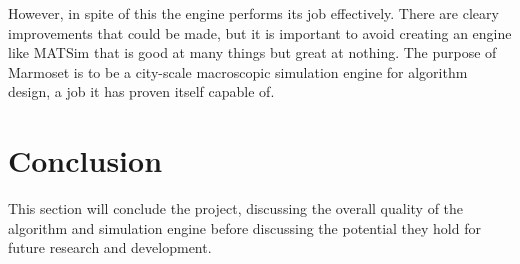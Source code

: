 \documentclass[ %
                    author={Alexander Hill},
                supervisor={Dr. Benjamin Sach},
                    degree={MEng},
                     title={MARMOSET},
                  subtitle={Multi-Agent Route Management using Online Simulation for Efficient Transportation},
                      type={research},
                      year={2016} ]{dissertation}
\begin{document}
However, in spite of this the engine performs its job effectively. There are
cleary improvements that could be made, but it is important to avoid creating
an engine like MATSim that is good at many things but great at nothing. The
purpose of Marmoset is to be a city-scale macroscopic simulation engine for
algorithm design, a job it has proven itself capable of.






\chapter{Conclusion}
\label{chap:conclusion}

This section will conclude the project, discussing the overall quality of the
algorithm and simulation engine before discussing the potential they hold for
future research and development.
\end{document}
